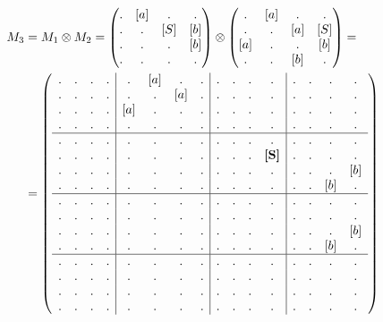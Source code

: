 \begin{example}
\begin{align}
M_3 &= M_1 \otimes M_2 = 
\begin{pmatrix} 
. & [a] & . & . \\
. & . & [S] & [b] \\
. & . & . & [b] \\
. & . & . & . 
\end{pmatrix}
\otimes 
\begin{pmatrix} 
. & [a] & . & . \\
. & . & [a] & [S] \\
[a] & . & . & [b] \\
. & . & [b] & . 
\end{pmatrix}
=\notag\\
&=
\left(\begin{array}{c c c c | c c c c | c c c c | c c c c } 
. & . & . & .  &  . & [a] & . & .  &  . & . & . & .    &  . & . & . & .   \\
. & . & . & .  &  . & . & [a] & .  &  . & . & . & .    &  . & . & . & .   \\
. & . & . & .  &  [a] & . & . & .  &  . & . & . & .    &  . & . & . & .   \\
. & . & . & .  &  . & . & . & .    &  . & . & . & .    &  . & . & . & .   \\
\hline
. & . & . & .  &  . & . & . & .    &  . & . & . & .    &  . & . & . & .   \\
. & . & . & .  &  . & . & . & .    &  . & . & . & \textbf{[S]}  &  . & . & . & .   \\
. & . & . & .  &  . & . & . & .    &  . & . & . & .    &  . & . & . & [b] \\
. & . & . & .  &  . & . & . & .    &  . & . & . & .    &  . & . & [b] & . \\
\hline
. & . & . & .  &  . & . & . & .    &  . & . & . & .    &  . & . & . & .   \\
. & . & . & .  &  . & . & . & .    &  . & . & . & .    &  . & . & . & .   \\
. & . & . & .  &  . & . & . & .    &  . & . & . & .    &  . & . & . & [b] \\
. & . & . & .  &  . & . & . & .    &  . & . & . & .    &  . & . & [b] & . \\
\hline
. & . & . & .  &  . & . & . & .    &  . & . & . & .    &  . & . & . & .   \\
. & . & . & .  &  . & . & . & .    &  . & . & . & .    &  . & . & . & .   \\
. & . & . & .  &  . & . & . & .    &  . & . & . & .    &  . & . & . & .   \\
. & . & . & .  &  . & . & . & .    &  . & . & . & .    &  . & . & . & . 
\end{array}\right)
\label{eq:graph_tm}
\end{align}


\end{example}
